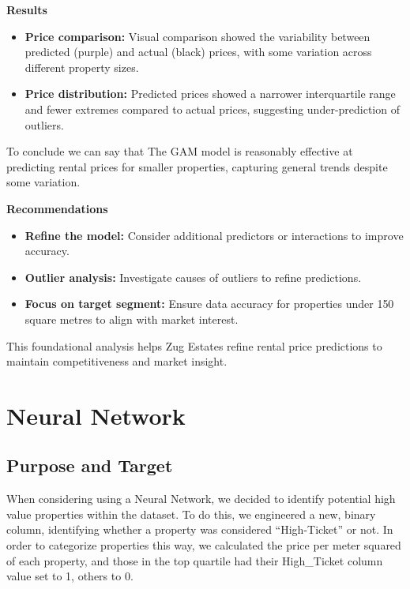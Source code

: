 \documentclass[
]{article}
\begin{document}
\textbf{Results}

\begin{itemize}
\item
  \textbf{Price comparison:} Visual comparison showed the variability
  between predicted (purple) and actual (black) prices, with some
  variation across different property sizes.
\item
  \textbf{Price distribution:} Predicted prices showed a narrower
  interquartile range and fewer extremes compared to actual prices,
  suggesting under-prediction of outliers.
\end{itemize}

To conclude we can say that The GAM model is reasonably effective at
predicting rental prices for smaller properties, capturing general
trends despite some variation.

\textbf{Recommendations}

\begin{itemize}
\item
  \textbf{Refine the model:} Consider additional predictors or
  interactions to improve accuracy.
\item
  \textbf{Outlier analysis:} Investigate causes of outliers to refine
  predictions.
\item
  \textbf{Focus on target segment:} Ensure data accuracy for properties
  under 150 square metres to align with market interest.
\end{itemize}

This foundational analysis helps Zug Estates refine rental price
predictions to maintain competitiveness and market insight.

\section{Neural Network}\label{neural-network}

\subsection{Purpose and Target}\label{purpose-and-target-4}

When considering using a Neural Network, we decided to identify
potential high value properties within the dataset. To do this, we
engineered a new, binary column, identifying whether a property was
considered ``High-Ticket'' or not. In order to categorize properties
this way, we calculated the price per meter squared of each property,
and those in the top quartile had their High\_Ticket column value set to
1, others to 0.
\end{document}
